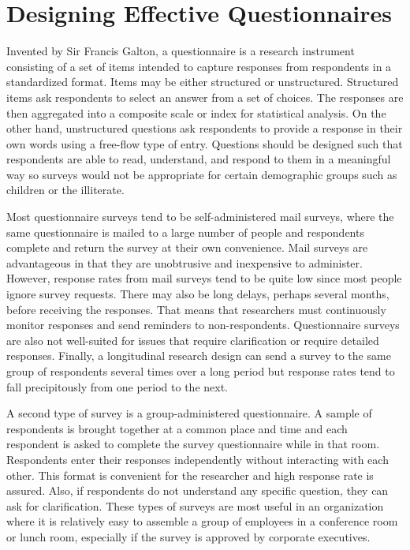 \section{Designing Effective Questionnaires}

Invented by Sir Francis Galton, a questionnaire is a research instrument consisting of a set of items intended to capture responses from respondents in a standardized format. Items may be either structured or unstructured. Structured items ask respondents to select an answer from a set of choices. The responses are then aggregated into a composite scale or index for statistical analysis. On the other hand, unstructured questions ask respondents to provide a response in their own words using a free-flow type of entry. Questions should be designed such that respondents are able to read, understand, and respond to them in a meaningful way so surveys would not be appropriate for certain demographic groups such as children or the illiterate. 

Most questionnaire surveys tend to be self-administered mail surveys, where the same questionnaire is mailed to a large number of people and respondents complete and return the survey at their own convenience. Mail surveys are advantageous in that they are unobtrusive and inexpensive to administer. However, response rates from mail surveys tend to be quite low since most people ignore survey requests. There may also be long delays, perhaps several months, before receiving the responses. That means that researchers must continuously monitor responses and send reminders to non-respondents. Questionnaire surveys are also not well-suited for issues that require clarification or require detailed responses. Finally, a longitudinal research design can send a survey to the same group of respondents several times over a long period but response rates tend to fall precipitously from one period to the next.

A second type of survey is a group-administered questionnaire. A sample of respondents is brought together at a common place and time and each respondent is asked to complete the survey questionnaire while in that room. Respondents enter their responses independently without interacting with each other. This format is convenient for the researcher and high response rate is assured. Also, if respondents do not understand any specific question, they can ask for clarification. These types of surveys are most useful in an organization where it is relatively easy to assemble a group of employees in a conference room or lunch room, especially if the survey is approved by corporate executives.

